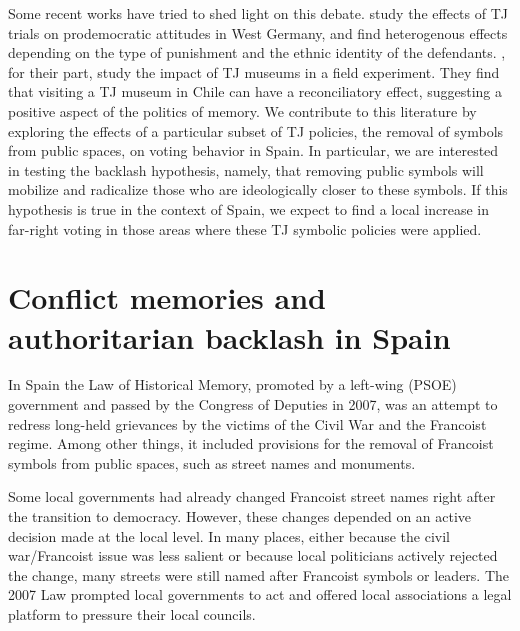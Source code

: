 \documentclass[12pt, notitlepage]{article}
\begin{document}
Some recent works have tried to shed light on this debate. \cite{Capoccia:2020aa} study the effects of TJ trials on prodemocratic attitudes in West Germany, and find heterogenous effects depending on the type of punishment and the ethnic identity of the defendants.
\cite{Balcells:2020aa}, for their part, study the impact of TJ museums in a field experiment. They find that visiting a TJ museum in Chile can have a reconciliatory effect, suggesting a positive aspect of the politics of memory.
We contribute to this literature by exploring the effects of a particular subset of TJ policies, the removal of symbols from public spaces, on voting behavior in Spain.
In particular, we are interested in testing the backlash hypothesis, namely, that removing public symbols will mobilize and radicalize those who are ideologically closer to these symbols.
If this hypothesis is true in the context of Spain, we expect to find a local increase in far-right voting in those areas where these TJ symbolic policies were applied.

\section*{Conflict memories and authoritarian backlash in Spain}


In Spain the Law of Historical Memory, promoted by a left-wing (PSOE) government and passed by the Congress of Deputies in 2007, was an attempt to redress long-held grievances by the victims of the Civil War and the Francoist regime.
Among other things, it included provisions for the removal of Francoist symbols from public spaces, such as street names and monuments.

Some local governments had already changed Francoist street names right after the transition to democracy.
However, these changes depended on an active decision made at the local level.
In many places, either because the civil war/Francoist issue was less salient or because local politicians actively rejected the change, many streets were still named after Francoist symbols or leaders.
The 2007 Law prompted local governments to act and offered local associations a legal platform to pressure their local councils.%
\end{document}
